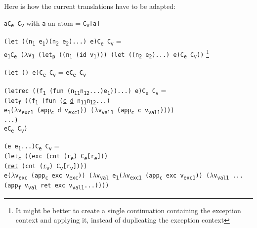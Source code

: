 \documentclass[12pt,a4paper]{article}
\newcommand{\cl}[3]{\texttt{\textcolor{OliveGreen}{#1}#2\textcolor{OliveGreen}{#3}}}
\newcommand{\cps}[3]{\texttt{\textcolor{BurntOrange}{#1}#2\textcolor{BurntOrange}{#3}}}
\newcommand{\ts}[2]{#1\textsubscript{#2}}
\newcommand{\code}[1]{\texttt{#1}}
\newcommand{\tran}[3]{\code{\textlbrackdbl #1\textrbrackdbl #2 #3}}
\newcommand{\cv}{\ts{C}{v}}
\newcommand{\ce}{\ts{C}{e}}
\newcommand{\letp}{\ts{let}{p}}
\newcommand{\letc}{\ts{let}{c}}
\newcommand{\letf}{\ts{let}{f}}
\newcommand{\appc}{\ts{app}{c}}
\newcommand{\appf}{\ts{app}{f}}
\begin{document}
Here is how the current translations have to be adapted:
\begin{description}
\item \tran{a}{\ce}{\cv} with \code{a} an atom = \code{\cv[a]}
\item \tran{\cl{(let }{((\ts{n}{1} \ts{e}{1})(\ts{n}{2} \ts{e}{2})...) e}{)}}{\ce}{\cv} = \\ \tran{\ts{e}{1}}{\ce}{($\lambda$\ts{v}{1} \cps{(\letp~}{((\ts{n}{1} (id \ts{v}{1}))) \tran{\cl{(let }{((\ts{n}{2} \ts{e}{2})...) e}{)}}{\ce}{\cv}}{)})} \footnote{It might be better to create a single continuation containing the exception context and applying it, instead of duplicating the exception context}
\item \tran{\cl{(let }{() e}{)}}{\ce}{\cv} = \tran{e}{\ce}{\cv}
\item \tran{\cl{(letrec }{\cl{(}{(\ts{f}{1} \cl{(fun }{(\ts{n}{11}\ts{n}{12}...)\ts{e}{1}}{)})...}{)} e}{)}}{\ce}{\cv} = \\ \cps{(\letf~}{\cps{(}{(\ts{f}{1} \cps{(fun }{(\underline{c} \underline{d} \ts{n}{11}\ts{n}{12}...) \\\hspace*{7em} \tran{\ts{e}{1}}{($\lambda$\ts{v}{exc1} \cps{(\appc~}{d \ts{v}{exc1}}{)})}{($\lambda$\ts{v}{val1} \cps{(\appc~}{c \ts{v}{val1}}{)})}}{)})\\\hspace*{3.4em}...}{)} \\\tran{e}{\ce}{\cv}}{)}
\item \tran{\cl{(}{e \ts{e}{1}...}{)}}{\ce}{\cv} = \\\cps{(\letc~}{\cps{(}{(\underline{exc} \cps{(cnt }{(\underline{\ts{r}{e}}) \ce[\ts{r}{e}]}{)}) \\\hspace*{3.4em}(\underline{ret} \cps{(cnt }{(\underline{\ts{r}{v}}) \cv[\ts{r}{v}]}{)})}{)}	\\\hspace*{1em}\tran{e}{($\lambda$\ts{v}{exc} \cps{(\appc~}{exc \ts{v}{exc}}{)})}{($\lambda$\ts{v}{val} \tran{\ts{e}{1}}{($\lambda$\ts{v}{exc1} \cps{(\appc~}{exc \ts{v}{exc1}}{)})}{($\lambda$\ts{v}{val1} ... \\\hspace*{3em}\cps{(\appf~}{\ts{v}{val} ret exc \ts{v}{val1}...}{)})})}}{)}
\end{description}
\end{document}

